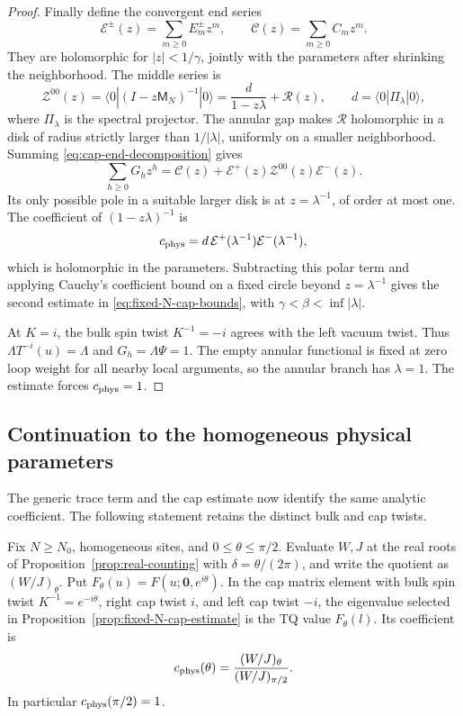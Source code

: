 \begin{proof}
Finally define the convergent end series
\[
 \mathcal E^\pm(z)=\sum_{m\ge0}E^\pm_m z^m,\qquad
 \mathcal C(z)=\sum_{m\ge0}C_mz^m .
\]
They are holomorphic for \(|z|<1/\gamma\), jointly with the parameters after shrinking the neighborhood. The middle series is
\[
 \mathcal Z^{00}(z)
 =\langle0|(I-z\mathsf M_N)^{-1}|0\rangle
 =\frac{d}{1-z\lambda}+\mathcal R(z),
 \qquad d=\langle0|\Pi_\lambda|0\rangle,
\]
where \(\Pi_\lambda\) is the spectral projector. The annular gap makes \(\mathcal R\) holomorphic in a disk of radius strictly larger than \(1/|\lambda|\), uniformly on a smaller neighborhood. Summing \eqref{eq:cap-end-decomposition} gives
\[
 \sum_{h\ge0}G_hz^h
 =\mathcal C(z)+\mathcal E^+(z)\mathcal Z^{00}(z)\mathcal E^-(z).
\]
Its only possible pole in a suitable larger disk is at \(z=\lambda^{-1}\), of order at most one. The coefficient of \((1-z\lambda)^{-1}\) is
\[
 c_{\rm phys}
 =d\,\mathcal E^+(\lambda^{-1})\mathcal E^-(\lambda^{-1}),
\]
which is holomorphic in the parameters. Subtracting this polar term and applying Cauchy's coefficient bound on a fixed circle beyond \(z=\lambda^{-1}\) gives the second estimate in \eqref{eq:fixed-N-cap-bounds}, with \(\gamma<\beta<\inf|\lambda|\).

At \(K=i\), the bulk spin twist \(K^{-1}=-i\) agrees with the left vacuum twist. Thus \(\Lambda T^{-i}(u)=\Lambda\) and \(G_h=\Lambda\Psi=1\). The empty annular functional is fixed at zero loop weight for all nearby local arguments, so the annular branch has \(\lambda=1\). The estimate forces \(c_{\rm phys}=1\).
\end{proof}

\subsection{Continuation to the homogeneous physical parameters}

The generic trace term and the cap estimate now identify the same analytic coefficient. The following statement retains the distinct bulk and cap twists.

\begin{proposition}\label{prop:physical-coefficient}
Fix \(N\ge N_0\), homogeneous sites, and \(0\le\theta\le\pi/2\). Evaluate \(W,J\) at the real roots of Proposition~\ref{prop:real-counting} with \(\delta=\theta/(2\pi)\), and write the quotient as \((W/J)_\theta\). Put \(F_\theta(u)=F(u;\mathbf0,e^{i\theta})\). In the cap matrix element with bulk spin twist \(K^{-1}=e^{-i\theta}\), right cap twist \(i\), and left cap twist \(-i\), the eigenvalue selected in Proposition~\ref{prop:fixed-N-cap-estimate} is the TQ value \(F_\theta(l)\). Its coefficient is
\begin{equation}\label{eq:physical-coefficient}
 c_{\rm phys}(\theta)=\frac{(W/J)_\theta}{(W/J)_{\pi/2}} .
\end{equation}
In particular \(c_{\rm phys}(\pi/2)=1\).
\end{proposition}

